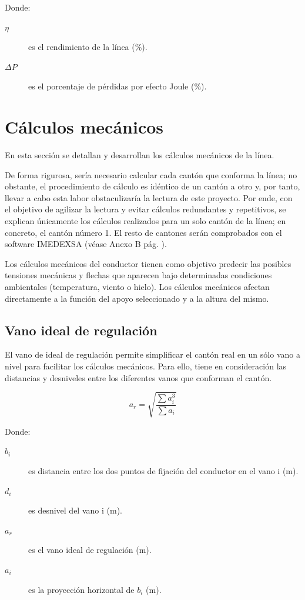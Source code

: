 Donde:
\begin{description}
  \item[$\eta$] es el rendimiento de la línea (\si{\percent}).
  \item[$\Delta P$] es el porcentaje de pérdidas por efecto Joule (\si{\percent}).
\end{description}

\section{Cálculos mecánicos}
\label{sec:mc-mecanicos}
En esta sección se detallan y desarrollan los cálculos mecánicos de la línea.

De forma rigurosa, sería necesario calcular cada cantón que conforma la línea; no obstante, el procedimiento de cálculo es idéntico de un cantón a otro y, por tanto, llevar a cabo esta labor obstaculizaría la lectura de este proyecto. Por ende, con el objetivo de agilizar la lectura y evitar cálculos redundantes y repetitivos, se explican únicamente los cálculos realizados para un solo cantón de la línea; en concreto, el cantón número 1. El resto de cantones serán comprobados con el software IMEDEXSA (véase Anexo B pág. \pageref{anexo:imedexsa}).

Los cálculos mecánicos del conductor tienen como objetivo predecir las posibles tensiones mecánicas y flechas que aparecen bajo determinadas condiciones ambientales (temperatura, viento o hielo). Los cálculos mecánicos afectan directamente a la función del apoyo seleccionado y a la altura del mismo.


\subsection{Vano ideal de regulación}
\label{subsec:cm-vanoReg}
El vano de ideal de regulación permite simplificar el cantón real en un sólo vano a nivel para facilitar los cálculos mecánicos. Para ello, tiene en consideración las distancias y desniveles entre los diferentes vanos que conforman el cantón.

\begin{equation}
a_r = \sqrt{\frac{\sum{a_i^3}}{\sum{a_i}}}
\label{eq:vanoReg}
\end{equation}

Donde:
\begin{description}
  \item[$b_i$] es distancia entre los dos puntos de fijación del conductor en el vano i (\si{\meter}).
  \item[$d_i$] es desnivel del vano i (\si{\meter}).
  \item[$a_r$] es el vano ideal de regulación  (\si{\meter}).
  \item[$a_i$] es la proyección horizontal de $b_i$ (\si{\meter}).
\end{description}


